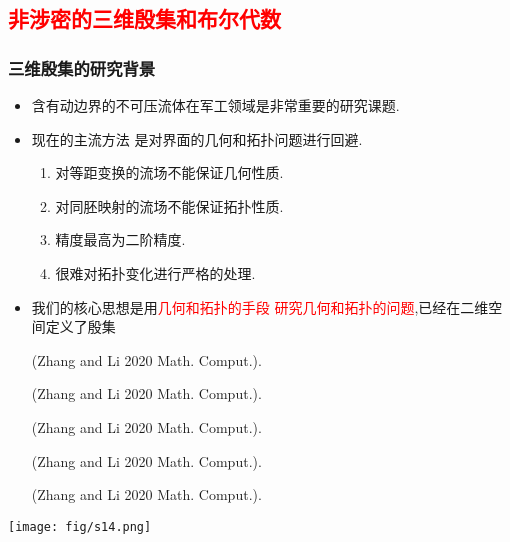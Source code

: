 \documentclass[UTF8]{ctexbeamer}	%
\theoremstyle{plain}
\theoremstyle{definition}
\theoremstyle{remark}
\numberwithin{equation}{section}
\begin{document}
\subsection{\textcolor{red}{非涉密的三维殷集和布尔代数}}
\begin{frame}
    \frametitle{三维殷集的研究背景}
    \begin{itemize}
        \item 含有动边界的不可压流体在军工领域是非常重要的研究课题.
        \item 现在的主流方法
              是对界面的几何和拓扑问题进行回避.
              \begin{enumerate}
                  \item 对等距变换的流场不能保证几何性质.
                  \item 对同胚映射的流场不能保证拓扑性质.
                  \item 精度最高为二阶精度.
                  \item 很难对拓扑变化进行严格的处理.
              \end{enumerate}
        \item 我们的核心思想是用\textcolor{red}{几何和拓扑的手段
                  研究几何和拓扑的问题},已经在二维空间定义了殷集

              (Zhang and Li 2020 Math. Comput.).

              \oscl (Zhang and Li 2020 Math. Comput.).

              \tnr (Zhang and Li 2020 Math. Comput.).

              \tim (Zhang and Li 2020 Math. Comput.).

              \roc (Zhang and Li 2020 Math. Comput.).
    \end{itemize}
    \begin{center}
        \texttt{[image: fig/s14.png]}
    \end{center}
\end{frame}
\end{document}
